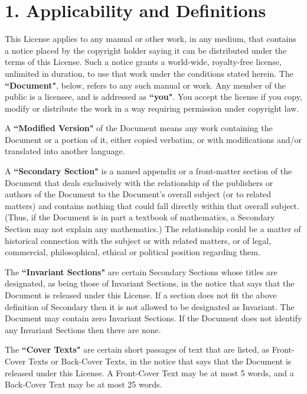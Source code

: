 \documentclass[12pt]{book}
\newcounter{exc}
\numberwithin{exc}{section}
\numberwithin{figure}{section}
\numberwithin{equation}{theorem}
\begin{document}
\section{1. Applicability and Definitions}

This License applies to any manual or other work, in any medium, that
contains a notice placed by the copyright holder saying it can be
distributed under the terms of this License.  Such a notice grants a
world-wide, royalty-free license, unlimited in duration, to use that
work under the conditions stated herein.  The \textbf{``Document"}, below,
refers to any such manual or work.  Any member of the public is a
licensee, and is addressed as \textbf{``you"}.  You accept the license if you
copy, modify or distribute the work in a way requiring permission
under copyright law.

A \textbf{``Modified Version"} of the Document means any work containing the
Document or a portion of it, either copied verbatim, or with
modifications and/or translated into another language.

A \textbf{``Secondary Section"} is a named appendix or a front-matter section of
the Document that deals exclusively with the relationship of the
publishers or authors of the Document to the Document's overall subject
(or to related matters) and contains nothing that could fall directly
within that overall subject.  (Thus, if the Document is in part a
textbook of mathematics, a Secondary Section may not explain any
mathematics.)  The relationship could be a matter of historical
connection with the subject or with related matters, or of legal,
commercial, philosophical, ethical or political position regarding
them.

The \textbf{``Invariant Sections"} are certain Secondary Sections whose titles
are designated, as being those of Invariant Sections, in the notice
that says that the Document is released under this License.  If a
section does not fit the above definition of Secondary then it is not
allowed to be designated as Invariant.  The Document may contain zero
Invariant Sections.  If the Document does not identify any Invariant
Sections then there are none.

The \textbf{``Cover Texts"} are certain short passages of text that are listed,
as Front-Cover Texts or Back-Cover Texts, in the notice that says that
the Document is released under this License.  A Front-Cover Text may
be at most 5 words, and a Back-Cover Text may be at most 25 words.
\end{document}
